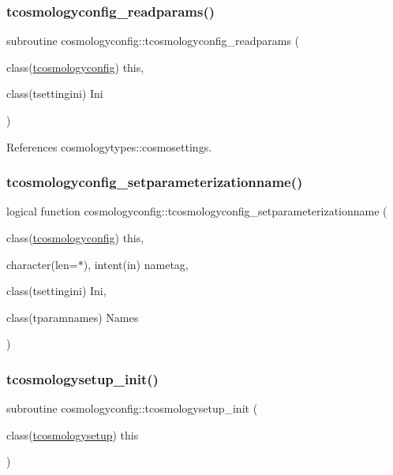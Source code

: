 \subsubsection{\texorpdfstring{tcosmologyconfig\+\_\+readparams()}{tcosmologyconfig\_readparams()}}
{\footnotesize\ttfamily subroutine cosmologyconfig\+::tcosmologyconfig\+\_\+readparams (\begin{DoxyParamCaption}\item[{class(\mbox{\hyperlink{structcosmologyconfig_1_1tcosmologyconfig}{tcosmologyconfig}})}]{this,  }\item[{class(tsettingini)}]{Ini }\end{DoxyParamCaption})\hspace{0.3cm}{\ttfamily [private]}}



References cosmologytypes\+::cosmosettings.

\mbox{\label{namespacecosmologyconfig_ab003a3843b0310a9aeb90e5598343458}} 
\subsubsection{\texorpdfstring{tcosmologyconfig\+\_\+setparameterizationname()}{tcosmologyconfig\_setparameterizationname()}}
{\footnotesize\ttfamily logical function cosmologyconfig\+::tcosmologyconfig\+\_\+setparameterizationname (\begin{DoxyParamCaption}\item[{class(\mbox{\hyperlink{structcosmologyconfig_1_1tcosmologyconfig}{tcosmologyconfig}})}]{this,  }\item[{character(len=$\ast$), intent(in)}]{nametag,  }\item[{class(tsettingini)}]{Ini,  }\item[{class(tparamnames)}]{Names }\end{DoxyParamCaption})}

\mbox{\label{namespacecosmologyconfig_a68dc4f75f02efd7cb4460a7dec05f508}} 
\subsubsection{\texorpdfstring{tcosmologysetup\+\_\+init()}{tcosmologysetup\_init()}}
{\footnotesize\ttfamily subroutine cosmologyconfig\+::tcosmologysetup\+\_\+init (\begin{DoxyParamCaption}\item[{class(\mbox{\hyperlink{structcosmologyconfig_1_1tcosmologysetup}{tcosmologysetup}})}]{this }\end{DoxyParamCaption})\hspace{0.3cm}{\ttfamily [private]}}

